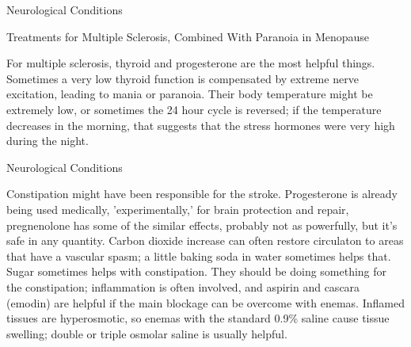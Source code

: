 \documentclass[11pt,oneside,openany,extrafontsizes]{memoir}
\begin{document}
\begin{standalonequote}{Neurological Conditions}
    \begin{note}
        Treatments for Multiple Sclerosis, Combined With Paranoia in Menopause
    \end{note}

    \begin{answer}
        For multiple sclerosis, thyroid and progesterone are the most helpful things. Sometimes a very low thyroid function is compensated by extreme nerve excitation, leading to mania or paranoia. Their body temperature might be extremely low, or sometimes the 24 hour cycle is reversed; if the temperature decreases in the morning, that suggests that the stress hormones were very high during the night.
    \end{answer}
\end{standalonequote}

\begin{standalonequote}{Neurological Conditions}

    \begin{answer}
        Constipation might have been responsible for the stroke. Progesterone is already being used medically, 'experimentally,' for brain protection and repair, pregnenolone has some of the similar effects, probably not as powerfully, but it's safe in any quantity. Carbon dioxide increase can often restore circulaton to areas that have a vascular spasm; a little baking soda in water sometimes helps that. Sugar sometimes helps with constipation. They should be doing something for the constipation; inflammation is often involved, and aspirin and cascara (emodin) are helpful if the main blockage can be overcome with enemas. Inflamed tissues are hyperosmotic, so enemas with the standard 0.9\% saline cause tissue swelling; double or triple osmolar saline is usually helpful.
    \end{answer}
\end{standalonequote}
\end{document}
